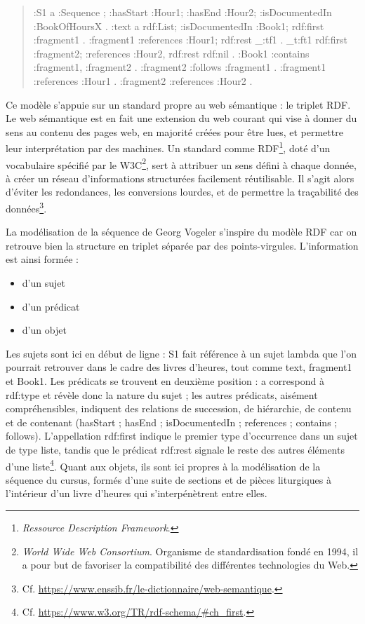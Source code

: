 \documentclass[a4paper,12pt,twoside]{book}
\begin{document}
	\begin{quote}
:S1 a :Sequence ; :hasStart :Hour1; :hasEnd :Hour2; :isDocumentedIn :BookOfHoursX .
:text a rdf:List; :isDocumentedIn :Book1; rdf:first :fragment1 .
:fragment1 :references :Hour1; rdf:rest _:tf1 . _t:ft1 rdf:first :fragment2; :references :Hour2, rdf:rest rdf:nil .
:Book1 :contains :fragment1, :fragment2 . :fragment2 :follows :fragment1 . :fragment1 :references :Hour1 . :fragment2 :references :Hour2 .
	\end{quote}
	
	Ce modèle s'appuie sur un standard propre au web sémantique : le triplet RDF. Le web sémantique est en fait une extension du web courant qui vise à donner du sens au contenu des pages web, en majorité créées pour être lues, et permettre leur interprétation par des machines. Un standard comme RDF\footnote{\textit{Ressource Description Framework}.}, doté d'un vocabulaire spécifié par le W3C\footnote{\textit{World Wide Web Consortium}. Organisme de standardisation fondé en 1994, il a pour but de favoriser la compatibilité des différentes technologies du Web.}, sert à attribuer un sens défini à chaque donnée, à créer un réseau d'informations structurées facilement réutilisable. Il s'agit alors d'éviter les redondances, les conversions lourdes, et de permettre la traçabilité des données\footnote{Cf. \url{https://www.enssib.fr/le-dictionnaire/web-semantique}.}. 
	
	La modélisation de la séquence de Georg Vogeler s'inspire du modèle RDF car on retrouve bien la structure en triplet séparée par des points-virgules. L'information est ainsi formée :
	\begin{itemize}
	    \item d'un sujet
	    \item d'un prédicat
	    \item d'un objet
	\end{itemize}
	Les sujets sont ici en début de ligne : \og S1\fg{} fait référence à un sujet lambda que l'on pourrait retrouver dans le cadre des livres d'heures, tout comme \og text\fg{}, \og fragment1\fg{} et \og Book1\fg{}. Les prédicats se trouvent en deuxième position : \og a\fg{} correspond à \og rdf:type\fg{} et révèle donc la nature du sujet ; les autres prédicats, aisément compréhensibles, indiquent des relations de succession, de hiérarchie, de contenu et de contenant (\og hasStart\fg{} ; \og hasEnd\fg{} ; \og isDocumentedIn\fg{} ; \og references\fg{} ; \og contains\fg{} ; \og follows\fg{}). L'appellation \og rdf:first\fg{} indique le premier type d'occurrence dans un sujet de type liste, tandis que le prédicat \og rdf:rest\fg{} signale le reste des autres éléments d'une liste\footnote{Cf. \url{https://www.w3.org/TR/rdf-schema/#ch_first}.}. Quant aux objets, ils sont ici propres à la modélisation de la séquence du cursus, formés d'une suite de sections et de pièces liturgiques à l'intérieur d'un livre d'heures qui s'interpénètrent entre elles. 
	
\end{document}
